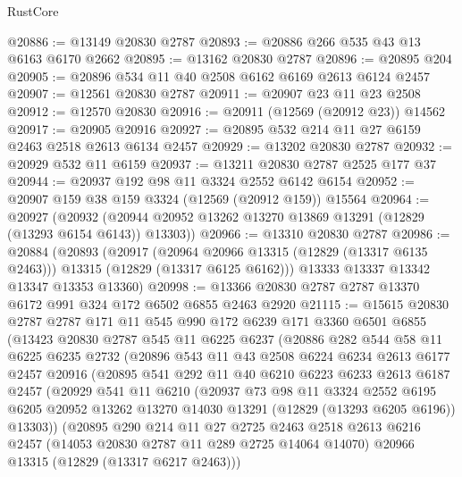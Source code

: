 \begin{lexlean}{RustCore}
\begin{coremodule}
@20886 := @13149 @20830 @2787
@20893 := @20886 @266 @535 @43 @13 @6163 @6170 @2662
@20895 := @13162 @20830 @2787
@20896 := @20895 @204
@20905 := @20896 @534 @11 @40 @2508 @6162 @6169 @2613 @6124 @2457
@20907 := @12561 @20830 @2787
@20911 := @20907 @23 @11 @23 @2508
@20912 := @12570 @20830
@20916 := @20911 (@12569 (@20912 @23)) @14562
@20917 := @20905 @20916
@20927 := @20895 @532 @214 @11 @27 @6159 @2463 @2518 @2613 @6134 @2457
@20929 := @13202 @20830 @2787
@20932 := @20929 @532 @11 @6159
@20937 := @13211 @20830 @2787 @2525 @177 @37
@20944 := @20937 @192 @98 @11 @3324 @2552 @6142 @6154
@20952 := @20907 @159 @38 @159 @3324 (@12569 (@20912 @159)) @15564
@20964 := @20927
    (@20932 (@20944 @20952 @13262 @13270 @13869 @13291 (@12829 (@13293 @6154 @6143)) @13303))
@20966 := @13310 @20830 @2787
@20986 := @20884
    (@20893
      (@20917
        (@20964 @20966 @13315 (@12829 (@13317 @6135 @2463)))
        @13315
        (@12829 (@13317 @6125 @6162)))
      @13333
      @13337
      @13342
      @13347
      @13353
      @13360)
@20998 := @13366 @20830 @2787 @2787 @13370 @6172 @991 @324 @172 @6502 @6855 @2463 @2920
@21115 := @15615
    @20830
    @2787
    @2787
    @171
    @11
    @545
    @990
    @172
    @6239
    @171
    @3360
    @6501
    @6855
    (@13423
      @20830
      @2787
      @545
      @11
      @6225
      @6237
      (@20886
        @282
        @544
        @58
        @11
        @6225
        @6235
        @2732
        (@20896
          @543
          @11
          @43
          @2508
          @6224
          @6234
          @2613
          @6177
          @2457
          @20916
          (@20895
            @541
            @292
            @11
            @40
            @6210
            @6223
            @6233
            @2613
            @6187
            @2457
            (@20929
              @541
              @11
              @6210
              (@20937
                @73
                @98
                @11
                @3324
                @2552
                @6195
                @6205
                @20952
                @13262
                @13270
                @14030
                @13291
                (@12829 (@13293 @6205 @6196))
                @13303))
            (@20895
              @290
              @214
              @11
              @27
              @2725
              @2463
              @2518
              @2613
              @6216
              @2457
              (@14053 @20830 @2787 @11 @289 @2725 @14064 @14070)
              @20966
              @13315
              (@12829 (@13317 @6217 @2463)))

\end{coremodule}
\end{lexlean}
